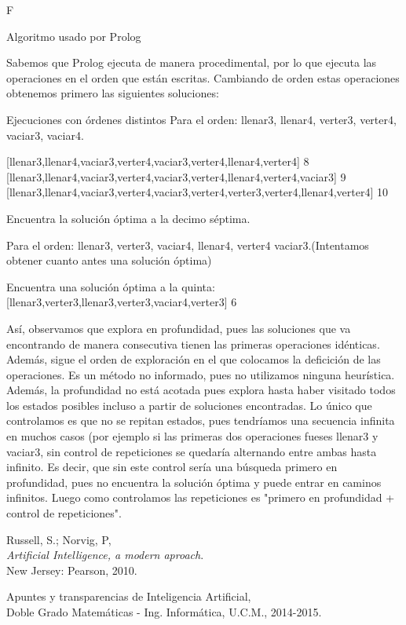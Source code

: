 F\documentclass[11pt, a4paper, spanish, openright, twoside]{book}
\begin{document}
	\begin{section}{Algoritmo usado por Prolog}

		Sabemos que Prolog ejecuta de manera procedimental, por lo que ejecuta las operaciones en el orden que están escritas. Cambiando de orden estas operaciones obtenemos primero las siguientes soluciones:

		\begin{subsection}{Ejecuciones con órdenes distintos}
			Para el orden:  llenar3, llenar4, verter3, verter4, vaciar3, vaciar4.

			[llenar3,llenar4,vaciar3,verter4,vaciar3,verter4,llenar4,verter4] 8
			[llenar3,llenar4,vaciar3,verter4,vaciar3,verter4,llenar4,verter4,vaciar3] 9
			[llenar3,llenar4,vaciar3,verter4,vaciar3,verter4,verter3,verter4,llenar4,verter4] 10
			
			Encuentra la solución óptima a la decimo séptima.

			Para el orden: llenar3, verter3, vaciar4, llenar4, verter4 vaciar3.(Intentamos obtener cuanto antes una solución óptima)

			Encuentra una solución óptima a la quinta:
			[llenar3,verter3,llenar3,verter3,vaciar4,verter3]  6
			
		\end{subsection}

		Así, observamos que explora en profundidad, pues las soluciones que va encontrando de manera consecutiva tienen las primeras operaciones idénticas. Además, 
		sigue el orden de exploración en el que colocamos la deficición de las operaciones. Es un método no informado, pues no utilizamos ninguna heurística. Además, la profundidad no está acotada 
		pues explora hasta haber visitado todos los estados posibles incluso a partir de soluciones encontradas. Lo único que controlamos es que no se repitan estados, pues tendríamos una secuencia infinita 
		en muchos casos (por ejemplo si las primeras dos operaciones fueses llenar3 y vaciar3, sin control de repeticiones se quedaría alternando entre ambas hasta infinito. Es decir, que sin este control sería una búsqueda 
		primero en profundidad, pues no encuentra la solución óptima y puede entrar en caminos infinitos. Luego como controlamos las repeticiones es "primero en profundidad + control de repeticiones".

	
	\end{section}

	
\begin{thebibliography}{9}

	Russell, S.; Norvig, P, \\
	\emph{Artificial Intelligence, a modern aproach}.\\
	New Jersey: Pearson, 2010.
	
	Apuntes y transparencias de Inteligencia Artificial, \\
	Doble Grado Matemáticas - Ing. Informática, U.C.M., 2014-2015.

\end{thebibliography}
\end{document}
